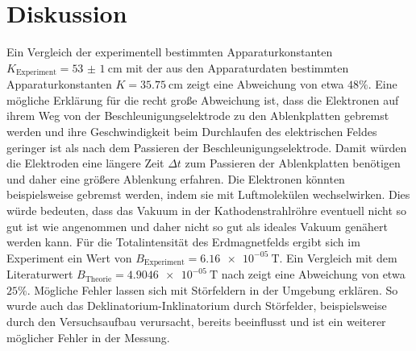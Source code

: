 \section{Diskussion}
\label{sec:Diskussion}
Ein Vergleich der experimentell bestimmten Apparaturkonstanten $K_\mathrm{Experiment}=\SI{53(1)}{\centi\meter}$ mit der aus den Apparaturdaten bestimmten Apparaturkonstanten $K=\SI{35.75}{\centi\meter}$ zeigt eine Abweichung von etwa $48\%$. Eine mögliche Erklärung für die recht große Abweichung ist, dass die Elektronen auf ihrem Weg von der Beschleunigungselektrode zu den Ablenkplatten gebremst werden und ihre Geschwindigkeit beim Durchlaufen des elektrischen Feldes geringer ist als nach dem Passieren der Beschleunigungselektrode. Damit würden die Elektroden eine längere Zeit $\Delta t$ zum Passieren der Ablenkplatten benötigen und daher eine größere Ablenkung erfahren.
Die Elektronen könnten beispielsweise gebremst werden, indem sie mit Luftmolekülen wechselwirken. Dies würde bedeuten, dass das Vakuum in der Kathodenstrahlröhre eventuell nicht so gut ist wie angenommen und daher nicht so gut als ideales Vakuum genähert werden kann.
Für die Totalintensität des Erdmagnetfelds ergibt sich im Experiment ein Wert von $B_\mathrm{Experiment}=\SI{6.16e-05}{\tesla}$. Ein Vergleich mit dem Literaturwert $B_\mathrm{Theorie}=\SI{4.9046e-05}{\tesla}$ nach \cite{bob} zeigt eine Abweichung von etwa $25\%$. Mögliche Fehler lassen sich mit Störfeldern in der Umgebung erklären. So wurde auch das Deklinatorium-Inklinatorium durch Störfelder, beispielsweise durch den Versuchsaufbau verursacht, bereits beeinflusst und ist ein weiterer möglicher Fehler in der Messung. 
